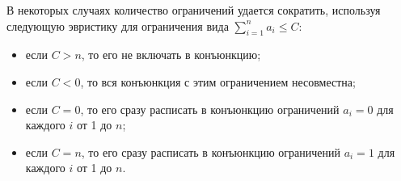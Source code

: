 %
%
%
%

В некоторых случаях количество ограничений удается сократить, используя следующую эвристику для ограничения вида $\sum_{i=1}^n a_i \leqslant C$:
\begin{itemize}
    \item если $C > n$, то его не включать в конъюнкцию;
    \item если $C < 0$, то вся конъюнкция с этим ограничением несовместна;
    \item если $C = 0$, то его сразу расписать в конъюнкцию ограничений
$a_i = 0$ для каждого $i$ от 1 до $n$;
    \item если $C = n$, то его сразу расписать в конъюнкцию ограничений
$a_i = 1$ для каждого $i$ от 1 до $n$.
\end{itemize}

